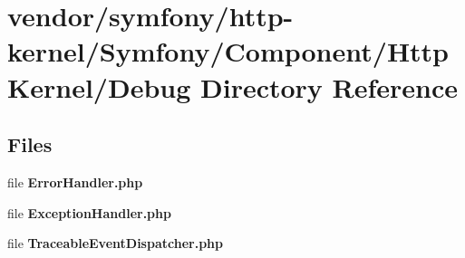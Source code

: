 \section{vendor/symfony/http-\/kernel/\+Symfony/\+Component/\+Http\+Kernel/\+Debug Directory Reference}
\label{dir_89515f3427f250d10a8aaeaf4592f11f}
\subsection*{Files}
\begin{DoxyCompactItemize}
\item 
file {\bf Error\+Handler.\+php}
\item 
file {\bf Exception\+Handler.\+php}
\item 
file {\bf Traceable\+Event\+Dispatcher.\+php}
\end{DoxyCompactItemize}
